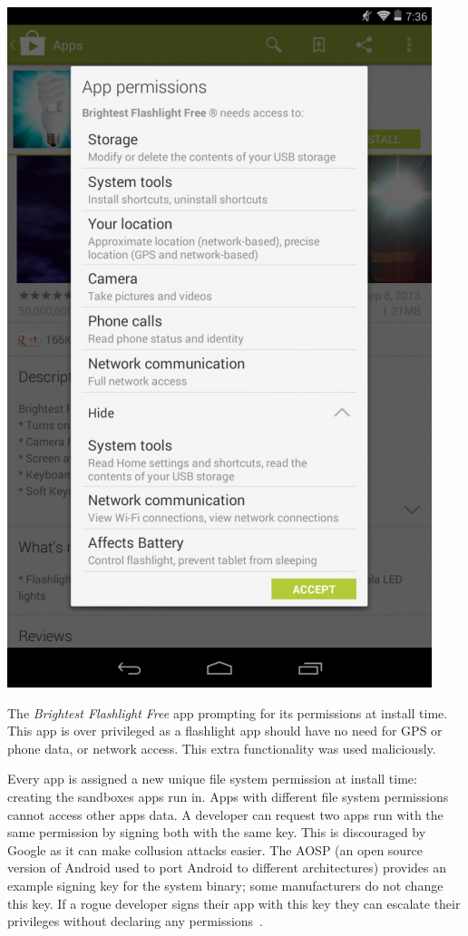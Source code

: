 \documentclass[a4paper]{article}
\begin{document}
\begin{marginfigure}
  \centering
  \includegraphics[width=\marginlength]{img/brightestflashlight.png}
  \caption{The \emph{Brightest Flashlight Free} app prompting for its permissions
    at install time. This app is over privileged as a flashlight app should have
    no need for GPS or phone data, or network access.  This extra functionality
  was used maliciously.}
\label{img:brightestflashlight}
\end{marginfigure}

Every app is assigned a new unique file system permission at install time:
creating the sandboxes apps run in.  Apps with different file system permissions
cannot access other apps data.  A developer can request two apps run with the
same permission by signing both with the same key.  This is discouraged by
Google as it can make collusion attacks easier.  The \ac{AOSP} (an open source
version of Android used to port Android to different architectures) provides an
example signing key for the system binary; some manufacturers do not change this
key.  If a rogue developer signs their app with this key they can escalate their
privileges without declaring any permissions~\cite{Zheng:vb}.
\end{document}
